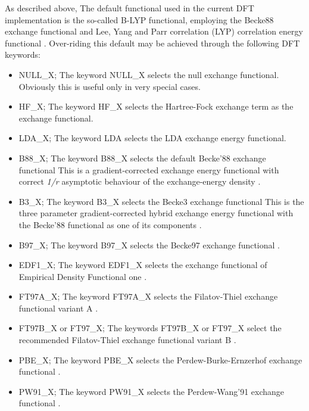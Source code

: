 \documentclass[11pt,fleqn]{article}
\begin{document}
As described above, The default functional used in the current DFT
implementation is the so-called B-LYP functional, employing the Becke88
exchange functional \cite{becke88} and Lee, Yang and Parr correlation
(LYP) correlation energy functional \cite{lyp}. Over-riding this
default may be achieved through the following DFT keywords:
\begin{itemize}

\item NULL\_X;
The keyword NULL\_X selects the null exchange functional.
Obviously this is useful only in very special cases.

\item HF\_X; 
The keyword HF\_X selects the Hartree-Fock exchange term as the
exchange functional.

\item LDA\_X;
The keyword LDA selects the LDA exchange energy functional.

\item B88\_X; 
The keyword B88\_X selects the default Becke'88 exchange functional
This is a gradient-corrected exchange energy functional with correct
{\em 1/r} asymptotic behaviour of the exchange-energy density \cite{becke88}.

\item B3\_X; 
The keyword B3\_X selects the Becke3 exchange functional
This is the three parameter gradient-corrected hybrid exchange energy functional
with the Becke'88 functional as one of its components \cite{becke93}.

\item B97\_X; 
The keyword B97\_X selects the Becke97 exchange functional \cite{becke97}.

\item EDF1\_X; 
The keyword EDF1\_X selects the exchange functional of Empirical Density 
Functional one \cite{adamson98}.

\item FT97A\_X; 
The keyword FT97A\_X selects the Filatov-Thiel exchange functional variant A
\cite{filatov97x}.

\item FT97B\_X or FT97\_X; 
The keywords FT97B\_X or FT97\_X select the recommended Filatov-Thiel exchange
functional variant B \cite{filatov97x}.

\item PBE\_X;
The keyword PBE\_X selects the Perdew-Burke-Ernzerhof exchange functional
\cite{perdew96}.

\item PW91\_X;
The keyword PW91\_X selects the Perdew-Wang'91 exchange functional
\cite{perdew92}.


\end{itemize}
\end{document}
